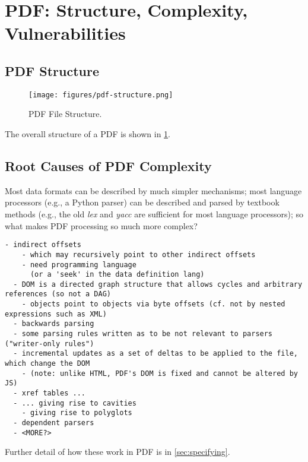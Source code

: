 \section{PDF: Structure, Complexity, Vulnerabilities}

\subsection{PDF Structure}

\begin{figure}[t]
    \centering
    \texttt{[image: figures/pdf-structure.png]}
    \caption{PDF File Structure.}
    \label{fig:pdf-structure}
\end{figure}

The overall structure of a PDF is shown in \cref{fig:pdf-structure}.

  

\subsection{Root Causes of PDF Complexity}

Most data formats can be described by much simpler mechanisms;
most language processors (e.g., a Python parser) can be described and parsed by
textbook methods (e.g., the old \emph{lex} and \emph{yacc} are sufficient for
most language processors);
so what makes PDF processing so much more complex?
\begin{lstlisting}[style=meta]
  - indirect offsets
    - which may recursively point to other indirect offsets
    - need programming language
      (or a 'seek' in the data definition lang)
  - DOM is a directed graph structure that allows cycles and arbitrary references (so not a DAG)
    - objects point to objects via byte offsets (cf. not by nested expressions such as XML)  
  - backwards parsing
  - some parsing rules written as to be not relevant to parsers ("writer-only rules")
  - incremental updates as a set of deltas to be applied to the file, which change the DOM
    - (note: unlike HTML, PDF's DOM is fixed and cannot be altered by JS)
  - xref tables ...
  - ... giving rise to cavities
    - giving rise to polyglots
  - dependent parsers
  - <MORE?>
\end{lstlisting}

Further detail of how these work in PDF is in \cref{sec:specifying}.

